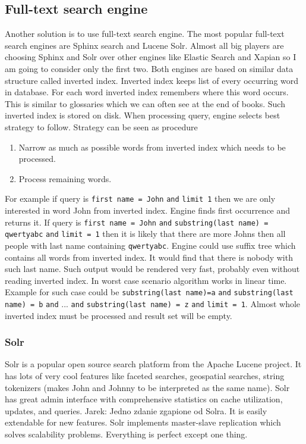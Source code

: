 \documentclass[10pt,a4paper]{article}
\newcommand{\jarek}[1]{\noindent\colorbox{myYellow}{Jarek: #1}}
\begin{document}
\subsection{Full-text search engine}
Another solution is to use full-text search engine. The most popular full-text search engines are Sphinx search and Lucene Solr. Almost all big players are choosing Sphinx and Solr over other engines like Elastic Search and Xapian so I am going to consider only the first two. Both engines are based on similar data structure called inverted index. Inverted index keeps list of every occurring word in database. For each word inverted index remembers where this word occurs. This is similar to glossaries which we can often see at the end of books. Such inverted index is stored on disk. When processing query, engine selects best strategy to follow. Strategy can be seen as procedure
\begin{enumerate}
\item Narrow as much as possible words from inverted index which needs to be processed. 
\item Process remaining words. 
\end{enumerate}
For example if query is \verb|first name = John| \verb|and| \verb|limit 1| then we are only interested in word John from inverted index. Engine finds first occurrence and returns it. If query is \verb|first name = John| \verb|and| \verb|substring(last name) = qwertyabc| \verb|and| \verb|limit = 1| then it is likely that there are more Johns then all people with last name containing \verb|qwertyabc|. Engine could use suffix tree which contains all words from inverted index. It would find that there is nobody with such last name. Such output would be rendered very fast, probably even without reading inverted index. In worst case scenario algorithm works in linear time. Example for such case could be \verb|substring(last name)=a| \verb|and| \verb|substring(last name) = b| \verb|and| ... \verb|and| \verb|substring(last name) = z| \verb|and| \verb|limit = 1|. Almost whole inverted index must be processed and result set will be empty.

\subsubsection{Solr}

Solr is a popular open source search platform from the Apache Lucene project. It has lots of very cool features like faceted searches, geospatial searches, string tokenizers (makes John and Johnny to be interpreted as the same name). Solr has great admin interface with comprehensive statistics on cache utilization, updates, and queries. \jarek{Jedno zdanie zgapione od Solra}. It is easily extendable for new features. Solr implements master-slave replication which solves scalability problems. Everything is perfect except one thing. 
\end{document}
